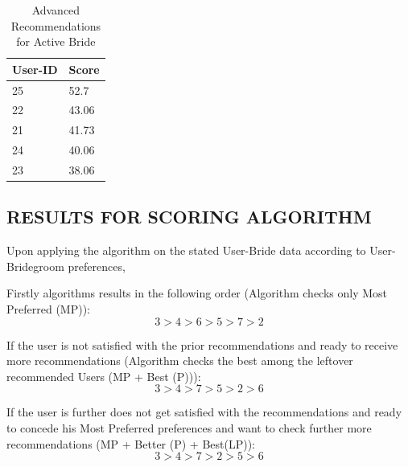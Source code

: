 \documentclass[12pt,oneside]{book}
\begin{document}
\begin{table}[h!]
\centering
\caption{Advanced Recommendations for Active Bride}
\vspace{0.1in}
  \begin{tabular}{|m{3cm}|m{2em}|}
 \hline
 User-ID & Score\\
\hline
25 & 52.7\\
\hline
22 & 43.06 \\
\hline
21 & 41.73 \\
\hline
24 & 40.06 \\
\hline
23 & 38.06 \\
\hline
\end{tabular}
\end{table}
\subsection{RESULTS FOR SCORING ALGORITHM }
Upon applying the algorithm on the stated User-Bride data according to User-Bridegroom preferences,

Firstly algorithms results in the following order (Algorithm checks only Most Preferred (MP)):
\[3 > 4 > 6 > 5 > 7 > 2\]

If the user is not satisfied with the prior recommendations and ready to receive more recommendations (Algorithm checks the best among the leftover recommended Users (MP + Best (P))):
\[3 > 4 > 7 > 5 > 2 > 6\]

If the user is further does not get satisfied with the recommendations and ready to concede his Most Preferred preferences and want to check further more recommendations (MP + Better (P)  + Best(LP)):
\[3 > 4 > 7 > 2 > 5 > 6\]
\end{document}
